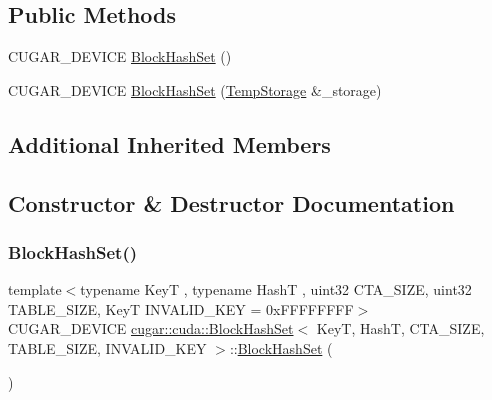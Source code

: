 \subsection*{Public Methods}
\begin{DoxyCompactItemize}
\item 
C\+U\+G\+A\+R\+\_\+\+D\+E\+V\+I\+CE \hyperlink{structcugar_1_1cuda_1_1_block_hash_set_a139df69fc33e2c5818d6be5722cb2077}{Block\+Hash\+Set} ()
\item 
C\+U\+G\+A\+R\+\_\+\+D\+E\+V\+I\+CE \hyperlink{structcugar_1_1cuda_1_1_block_hash_set_aa5ebb1fcc80e0f7e097a383237160587}{Block\+Hash\+Set} (\hyperlink{structcugar_1_1cuda_1_1_block_hash_set_1_1_temp_storage}{Temp\+Storage} \&\+\_\+storage)
\end{DoxyCompactItemize}
\subsection*{Additional Inherited Members}


\subsection{Constructor \& Destructor Documentation}
\mbox{\label{structcugar_1_1cuda_1_1_block_hash_set_a139df69fc33e2c5818d6be5722cb2077}} 
\subsubsection{\texorpdfstring{Block\+Hash\+Set()}{BlockHashSet()}\hspace{0.1cm}{\footnotesize\ttfamily [1/2]}}
{\footnotesize\ttfamily template$<$typename KeyT , typename HashT , uint32 C\+T\+A\+\_\+\+S\+I\+ZE, uint32 T\+A\+B\+L\+E\+\_\+\+S\+I\+ZE, KeyT I\+N\+V\+A\+L\+I\+D\+\_\+\+K\+EY = 0x\+F\+F\+F\+F\+F\+F\+FF$>$ \\
C\+U\+G\+A\+R\+\_\+\+D\+E\+V\+I\+CE \hyperlink{structcugar_1_1cuda_1_1_block_hash_set}{cugar\+::cuda\+::\+Block\+Hash\+Set}$<$ KeyT, HashT, C\+T\+A\+\_\+\+S\+I\+ZE, T\+A\+B\+L\+E\+\_\+\+S\+I\+ZE, I\+N\+V\+A\+L\+I\+D\+\_\+\+K\+EY $>$\+::\hyperlink{structcugar_1_1cuda_1_1_block_hash_set}{Block\+Hash\+Set} (\begin{DoxyParamCaption}{ }\end{DoxyParamCaption})\hspace{0.3cm}{\ttfamily [inline]}}


